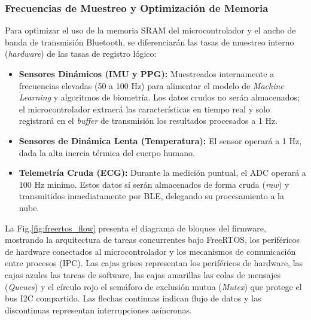 \documentclass[letterpaper,11pt]{article}
\newcommand{\rfigura}[1]{Fig.\ref{#1}}
\begin{document}
\subsubsection{Frecuencias de Muestreo y Optimización de Memoria}
Para optimizar el uso de la memoria SRAM del microcontrolador y el ancho de banda de transmisión Bluetooth, se diferenciarán las tasas de muestreo interno (\textit{hardware}) de las tasas de registro lógico:
\begin{itemize}
    \item \textbf{Sensores Dinámicos (IMU y PPG):} Muestreados internamente a frecuencias elevadas (50 a 100 Hz) para alimentar el modelo de \textit{Machine Learning} y algoritmos de biometría. Los datos crudos no serán almacenados; el microcontrolador extraerá las características en tiempo real y solo registrará en el \textit{buffer} de transmisión los resultados procesados a 1 Hz.
    \item \textbf{Sensores de Dinámica Lenta (Temperatura):} El sensor operará a 1 Hz, dada la alta inercia térmica del cuerpo humano.
    \item \textbf{Telemetría Cruda (ECG):} Durante la medición puntual, el ADC operará a 100 Hz mínimo. Estos datos sí serán almacenados de forma cruda (\textit{raw}) y transmitidos inmediatamente por BLE, delegando su procesamiento a la nube.
\end{itemize}


La \rfigura{fig:freertos_flow} presenta el diagrama de bloques del firmware, mostrando la arquitectura de tareas concurrentes bajo FreeRTOS, los periféricos de hardware conectados al microcontrolador y los mecanismos de comunicación entre procesos (IPC). Las cajas grises representan los periféricos de hardware, las cajas azules las tareas de software, las cajas amarillas las colas de mensajes (\textit{Queues}) y el círculo rojo el semáforo de exclusión mutua (\textit{Mutex}) que protege el bus I2C compartido. Las flechas continuas indican flujo de datos y las discontinuas representan interrupciones asíncronas.
\end{document}
